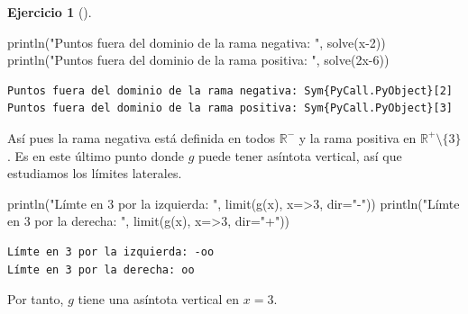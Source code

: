 \documentclass[
  a4paper,
]{scrreport}
\newenvironment{Shaded}{\begin{snugshade}}{\end{snugshade}}
\newcommand{\FloatTok}[1]{\textcolor[rgb]{0.68,0.00,0.00}{#1}}
\newcommand{\FunctionTok}[1]{\textcolor[rgb]{0.28,0.35,0.67}{#1}}
\newcommand{\NormalTok}[1]{\textcolor[rgb]{0.00,0.23,0.31}{#1}}
\newcommand{\OperatorTok}[1]{\textcolor[rgb]{0.37,0.37,0.37}{#1}}
\newcommand{\SpecialCharTok}[1]{\textcolor[rgb]{0.37,0.37,0.37}{#1}}
\newcommand{\StringTok}[1]{\textcolor[rgb]{0.13,0.47,0.30}{#1}}
\theoremstyle{definition}
\newtheorem{exercise}{Ejercicio}[chapter]
\theoremstyle{remark}
\begin{document}
\begin{exercise}[]
\begin{enumerate}
\begin{tcolorbox}
\begin{Shaded}
\begin{Highlighting}[]
\FunctionTok{println}\NormalTok{(}\StringTok{"Puntos fuera del dominio de la rama negativa: "}\NormalTok{, }\FunctionTok{solve}\NormalTok{(x}\OperatorTok{{-}}\FloatTok{2}\NormalTok{))}
\FunctionTok{println}\NormalTok{(}\StringTok{"Puntos fuera del dominio de la rama positiva: "}\NormalTok{, }\FunctionTok{solve}\NormalTok{(}\FloatTok{2}\NormalTok{x}\OperatorTok{{-}}\FloatTok{6}\NormalTok{))}
\end{Highlighting}
\end{Shaded}

\begin{verbatim}
Puntos fuera del dominio de la rama negativa: Sym{PyCall.PyObject}[2]
Puntos fuera del dominio de la rama positiva: Sym{PyCall.PyObject}[3]
\end{verbatim}

  Así pues la rama negativa está definida en todos \(\mathbb{R}^-\) y la
  rama positiva en \(\mathbb{R}^+\setminus\{3\}\). Es en este último
  punto donde \(g\) puede tener asíntota vertical, así que estudiamos
  los límites laterales.

\begin{Shaded}
\begin{Highlighting}[]
\FunctionTok{println}\NormalTok{(}\StringTok{"Límte en 3 por la izquierda: "}\NormalTok{, }\FunctionTok{limit}\NormalTok{(}\FunctionTok{g}\NormalTok{(x), x}\OperatorTok{=\textgreater{}}\FloatTok{3}\NormalTok{, dir}\OperatorTok{=}\StringTok{"{-}"}\NormalTok{))}
\FunctionTok{println}\NormalTok{(}\StringTok{"Límte en 3 por la derecha: "}\NormalTok{, }\FunctionTok{limit}\NormalTok{(}\FunctionTok{g}\NormalTok{(x), x}\OperatorTok{=\textgreater{}}\FloatTok{3}\NormalTok{, dir}\OperatorTok{=}\StringTok{"+"}\NormalTok{))}
\end{Highlighting}
\end{Shaded}

\begin{verbatim}
Límte en 3 por la izquierda: -oo
Límte en 3 por la derecha: oo
\end{verbatim}

  Por tanto, \(g\) tiene una asíntota vertical en \(x=3\).

\begin{Shaded}
\end{Shaded}


\end{tcolorbox}
\end{enumerate}
\end{exercise}
\end{document}
